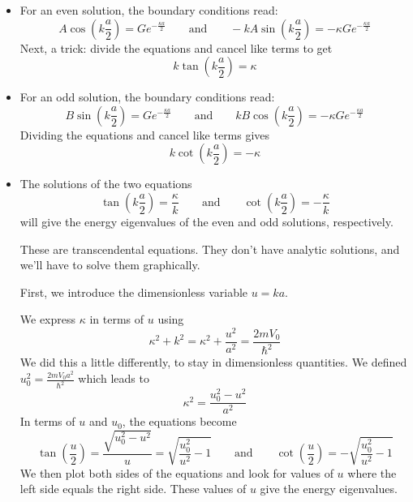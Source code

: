 \documentclass[11pt, a4paper]{article}
\newcommand{\eqtext}[1]{\qquad \text{#1} \qquad}
\begin{document}
\begin{itemize}
	\item For an even solution, the boundary conditions read:
	\begin{equation*}
		A \cos\left(k\frac{a}{2}\right) = Ge^{-\frac{\kappa a}{2}} \eqtext{and} -kA\sin(k\frac{a}{2}) = - \kappa Ge^{-\frac{\kappa a}{2}}
	\end{equation*}
	Next, a trick: divide the equations and cancel like terms to get
	\begin{equation*}
		k \tan (k\frac{a}{2}) = \kappa 
	\end{equation*}
	
	\item For an odd solution, the boundary conditions read:
	\begin{equation*}
		B \sin \left(k\frac{a}{2}\right) = Ge^{-\frac{\kappa a}{2}} \eqtext{and} kB\cos(k\frac{a}{2}) = -\kappa Ge^{-\frac{\kappa a}{2}}
	\end{equation*}
	Dividing the equations and cancel like terms gives
	\begin{equation*}
		k \cot (k\frac{a}{2}) = -\kappa 
	\end{equation*}
	
	\item The solutions of the two equations
	\begin{equation*}
		\tan (k\frac{a}{2}) = \frac{\kappa}{k}  \eqtext{and}  \cot (k\frac{a}{2}) = -\frac{\kappa}{k} 
	\end{equation*}
	will give the energy eigenvalues of the even and odd solutions, respectively. 
	
	These are transcendental equations. They don't have analytic solutions, and we'll have to solve them graphically. 
	
	First, we introduce the dimensionless variable $ u = k a $. 
	
	We express $ \kappa $ in terms of $ u $ using
	\begin{equation*}
		\kappa^{2} + k^{2} = \kappa^{2} + \frac{u^{2}}{a^{2}}  = \frac{2mV_{0}}{\hbar^{2}}
	\end{equation*}
	We did this a little differently, to stay in dimensionless quantities. We defined $ u_{0}^{2} = \frac{2mV_{0}a^{2}}{\hbar^{2}} $ which leads to
	\begin{equation*}
		\kappa^{2} = \frac{u_{0}^{2} - u^{2}}{a^{2}}
	\end{equation*}
	In terms of $ u $ and $ u_{0} $, the equations become
	\begin{equation*}
		\tan(\frac{u}{2}) = \frac{\sqrt{u_{0}^{2} - u^{2}}}{u} = \sqrt{\frac{u_{0}^{2}}{u^{2}} - 1} \eqtext{and} \cot(\frac{u}{2}) = -\sqrt{\frac{u_{0}^{2}}{u^{2}} - 1}
	\end{equation*}
	We then plot both sides of the equations and look for values of $ u $ where the left side equals the right side. These values of $ u $ give the energy eigenvalues. 
	

\end{itemize}
\end{document}
